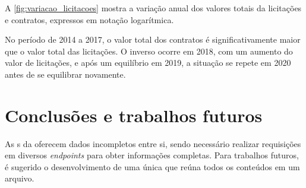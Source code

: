 \documentclass[
	12pt,				%
	oneside,			%
	a4paper,			%
	chapter=TITLE,		%
	section=TITLE,		%
	english,			%
	brazil				%
	]{abntex2}
\begin{document}
A \autoref{fig:variacao_licitacoes} mostra a variação anual dos valores totais da licitações e contratos, expressos em notação logarítmica.

No período de 2014 a 2017, o valor total dos contratos é significativamente maior que o valor total das licitações. O inverso ocorre em 2018, com um aumento do valor de licitações, e após um equilíbrio em 2019, a situação se repete em 2020 antes de se equilibrar novamente.

\chapter{Conclusões e trabalhos futuros}
\label{cap:Conclusoes}

As s da  oferecem dados incompletos entre si, sendo necessário realizar requisições em diversos \textit{endpoints} para obter informações completas. Para trabalhos futuros, é sugerido o desenvolvimento de uma única  que reúna todos os conteúdos em um arquivo.

\postextual

\begingroup
    \SingleSpacing\printbibliography[title=REFERÊNCIAS]
\endgroup

%
%


%	



%	

\end{document}
